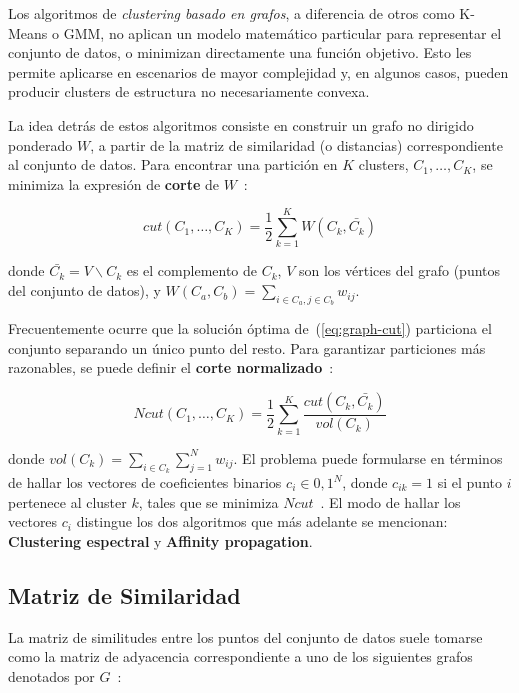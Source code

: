 Los algoritmos de \textit{clustering basado en grafos}, a diferencia de otros como K-Means o GMM, no aplican un modelo matemático particular para representar el conjunto de datos, o minimizan directamente una función objetivo.
Esto les permite aplicarse en escenarios de mayor complejidad y, en algunos casos, pueden producir clusters de estructura no necesariamente convexa.

La idea detrás de estos algoritmos consiste en construir un grafo no dirigido ponderado $W$, a partir de la matriz de similaridad (o distancias) correspondiente al conjunto de datos.
Para encontrar una partición en $K$ clusters, $C_1,\dots,C_K$, se minimiza la expresión de \textbf{corte} de $W$~\cite{Murphy12}:

\begin{equation}
    \label{eq:graph-cut}
    cut(C_1,\dots,C_K) = \frac{1}{2}\sum_{k=1}^{K}{W(C_k,\bar{C_k})}
\end{equation}

\noindent
donde $\bar{C_k}=V\backslash C_k$ es el complemento de $C_k$, $V$ son los vértices del grafo (puntos del conjunto de datos), y $W(C_a,C_b) = \sum_{i\in C_a, j \in C_b}{w_{ij}}$.

Frecuentemente ocurre que la solución óptima de~(\ref{eq:graph-cut}) particiona el conjunto separando un único punto del resto.
Para garantizar particiones más razonables, se puede definir el \textbf{corte normalizado}~\cite{Murphy12}:

\begin{equation}
    \label{eq:normalized-cut}
    Ncut(C_1,\dots,C_K) = \frac{1}{2}\sum_{k=1}^{K}{\frac{cut(C_k,\bar{C_k})}{vol(C_k)}}
\end{equation}

\noindent
donde $vol(C_k)=\sum_{i\in C_k}\sum_{j=1}^{N}{w_{ij}}$.
El problema puede formularse en términos de hallar los vectores de coeficientes binarios $c_i\in{0,1}^N$, donde $c_{ik} = 1$ si el punto $i$ pertenece al cluster $k$, tales que se minimiza $Ncut$~\cite{Murphy12}.
El modo de hallar los vectores $c_i$ distingue los dos algoritmos que más adelante se mencionan: \textbf{Clustering espectral} y \textbf{Affinity propagation}.

\subsection{Matriz de Similaridad}\label{subsec:matrizDeSimilaridad}

La matriz de similitudes entre los puntos del conjunto de datos suele tomarse como la matriz de adyacencia correspondiente a uno de los siguientes grafos denotados por $G$~\cite{Luxburg07,Aggarawal13}:

